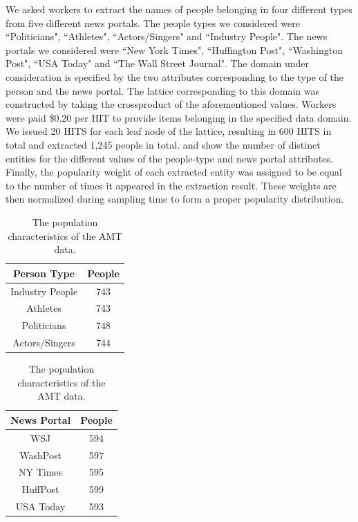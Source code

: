 We asked workers to extract the names of people belonging in four different types from five different news portals. The people types we considered were ``Politicians", ``Athletes", ``Actors/Singers" and ``Industry People". The news portals we considered were ``New York Times", ``Huffington Post", ``Washington Post", ``USA  Today" and ``The Wall Street Journal". The domain under consideration is specified by the two attributes corresponding to the type of the person and the news portal. The lattice corresponding to this domain was constructed by taking the crossproduct of the aforementioned values. Workers were paid \$0.20 per HIT to provide items belonging in the specified data domain. We issued 20 HITS for each leaf node of the lattice, resulting in 600 HITS in total and extracted 1,245 people in total.  and  show the number of distinct entities for the different values of the people-type and news portal attributes. Finally, the popularity weight of each extracted entity was assigned to be equal to the number of times it appeared in the extraction result. These weights are then normalized during sampling time to form a proper popularity distribution.

\begin{table}
\center
\caption{The population characteristics of the AMT data.}
\label{tab:ptypedata}
\begin{tabular}{|c|c|}
\hline
\textbf{Person Type} & \textbf{People} \\ \hline
Industry People & 743 \\
Athletes & 743 \\
Politicians & 748 \\
Actors/Singers & 744 \\ \hline \hline
\end{tabular}
\end{table}


\begin{table}
\center
\caption{The population characteristics of the AMT data.}
\label{tab:ntypedata}
\begin{tabular}{|c|c|}
\hline
\textbf{News Portal} & \textbf{People} \\ \hline
WSJ & 594 \\
WashPost & 597 \\
NY Times & 595 \\
HuffPost & 599 \\
USA Today & 593 \\ \hline
\end{tabular}
\end{table}


